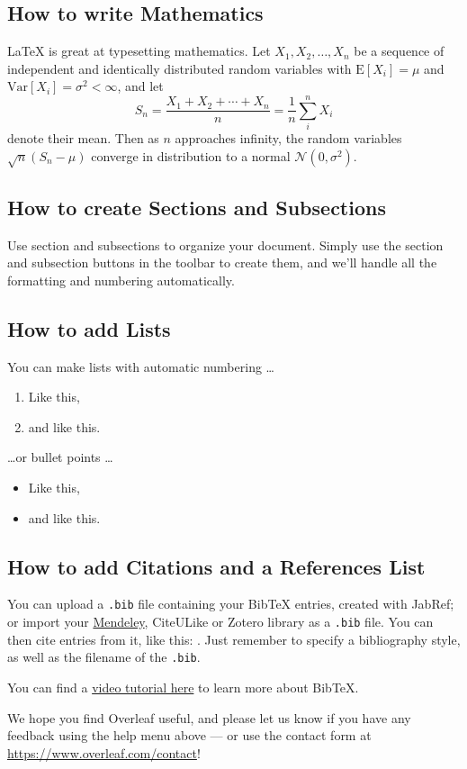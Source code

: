 \documentclass[a4paper]{article}
\begin{document}
\subsection{How to write Mathematics}

\LaTeX{} is great at typesetting mathematics. Let $X_1, X_2, \ldots, X_n$ be a sequence of independent and identically distributed random variables with $\text{E}[X_i] = \mu$ and $\text{Var}[X_i] = \sigma^2 < \infty$, and let
\[S_n = \frac{X_1 + X_2 + \cdots + X_n}{n}
      = \frac{1}{n}\sum_{i}^{n} X_i\]
denote their mean. Then as $n$ approaches infinity, the random variables $\sqrt{n}(S_n - \mu)$ converge in distribution to a normal $\mathcal{N}(0, \sigma^2)$.


\subsection{How to create Sections and Subsections}

Use section and subsections to organize your document. Simply use the section and subsection buttons in the toolbar to create them, and we'll handle all the formatting and numbering automatically.

\subsection{How to add Lists}

You can make lists with automatic numbering \dots

\begin{enumerate}
\item Like this,
\item and like this.
\end{enumerate}
\dots or bullet points \dots
\begin{itemize}
\item Like this,
\item and like this.
\end{itemize}

\subsection{How to add Citations and a References List}

You can upload a \verb|.bib| file containing your BibTeX entries, created with JabRef; or import your \href{https://www.overleaf.com/blog/184}{Mendeley}, CiteULike or Zotero library as a \verb|.bib| file. You can then cite entries from it, like this: \cite{greenwade93}. Just remember to specify a bibliography style, as well as the filename of the \verb|.bib|.

You can find a \href{https://www.overleaf.com/help/97-how-to-include-a-bibliography-using-bibtex}{video tutorial here} to learn more about BibTeX.

We hope you find Overleaf useful, and please let us know if you have any feedback using the help menu above --- or use the contact form at \url{https://www.overleaf.com/contact}!




\end{document}
